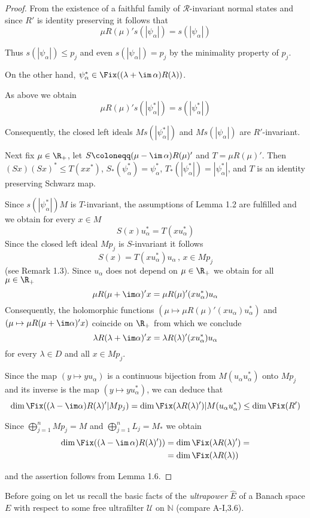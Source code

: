 \begin{proof}
From the existence of a faithful family of $\mathcal{R}$-invariant normal states and since $R'$ is identity preserving it follows that
\[
\mu R(\mu)'s(|\psi_{\alpha}|) = s(|\psi_{\alpha}|)
\]







Thus $s(|\psi_{\alpha}|) \leq p_{j}$ and even $s(|\psi_{\alpha}|) = p_{j}$ by the minimality property of $p_{j}$.

On the other hand, $\psi_{\alpha}^{*} \in \Fix((\lambda + \im\,\alpha)R(\lambda))$.

As above we obtain
\[
\mu R(\mu)'s(|\psi_{\alpha}^{*}|) = s(|\psi_{\alpha}^{*}|)
\]

Consequently, the closed left ideals $Ms(|\psi_{\alpha}^{*}|)$ and $Ms(|\psi_{\alpha}|)$ are $R'$-invariant.

Next fix $\mu \in \R_{+}$, let $S \coloneqq (\mu - \im\,\alpha)R(\mu)'$ and $T = \mu R(\mu)'$.
Then $(Sx)(Sx)^{*} \leq T(xx^{*})$, $S_{*}(\psi_{\alpha}^{*}) = \psi_{\alpha}^{*}$, $T_{*}(|\psi_{\alpha}^{*}|) = |\psi_{\alpha}^{*}|$, and $T$ is an identity preserving Schwarz map.

Since $s(|\psi_{\alpha}^{*}|)M$ is $T$-invariant, the assumptions of Lemma 1.2 are fulfilled and we obtain for every $x \in M$
\[
S(x)u_{\alpha}^{*} = T(xu_{\alpha}^{*})
\]
Since the closed left ideal $Mp_{j}$ is $S$-invariant it follows
\[
S(x) = T(xu_{\alpha}^{*})u_{\alpha} \, , \, x \in Mp_{j}
\]
(see Remark 1.3).
Since $u_{\alpha}$ does not depend on $\mu \in \R_{+}$ we obtain for all $\mu \in \R_{+}$
\[
\mu R(\mu+\im\alpha)'x = \mu R(\mu)'(xu_{\alpha}^{*})u_{\alpha}
\]
Consequently, the holomorphic functions $(\mu \mapsto \mu R(\mu)'(xu_{\alpha})u_{\alpha}^{*})$ and $(\mu \mapsto \mu R(\mu+\im\alpha)'x)$ coincide on $\R_{+}$ from which we conclude
\[
\lambda R(\lambda+\im\alpha)'x = \lambda R(\lambda)'(xu_{\alpha}^{*})u_{\alpha}
\]
for every $\lambda \in D$ and all $x \in Mp_{j}$.

Since the map $(y \mapsto yu_{\alpha})$ is a continuous bijection from $M(u_{\alpha}u_{\alpha}^{*})$ onto $Mp_{j}$ and its inverse is the map $(y \mapsto yu_{\alpha}^{*})$, we can deduce that
\[
\dim \Fix((\lambda-\im\alpha)R(\lambda)'|Mp_{j}) = \dim \Fix(\lambda R(\lambda)')|M(u_{\alpha}u_{\alpha}^{*}) \leq \dim \Fix(R')
\]

Since $\bigoplus_{j=1}^{n} Mp_{j} = M$ and $\bigoplus_{j=1}^{n} L_{j} = M_{*}$ we obtain
\begin{align*}
\dim \Fix((\lambda - \im\,\alpha)R(\lambda)')) &= \dim \Fix(\lambda R(\lambda)') = \\
&= \dim \Fix(\lambda R(\lambda))
\end{align*}






and the assertion follows from Lemma 1.6.
\end{proof}
Before going on let us recall the basic facts of the \emph{ultrapower} $\hat{E}$ of a Banach space $E$ with respect to some free ultrafilter $\mathcal{U}$ on $\mathbb{N}$ (compare A-I,3.6).

